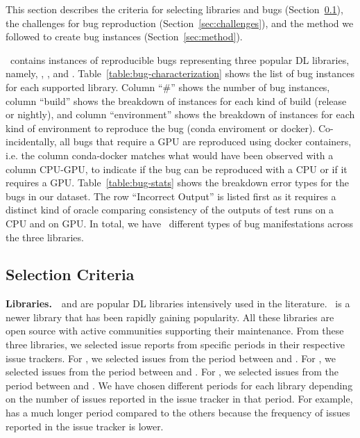 \documentclass[sigconf,screen]{acmart}
\begin{document}
This section describes the criteria for selecting libraries and bugs
(Section~\ref{sec:selection-criterion}), the challenges for bug
reproduction (Section~\ref{sec:challenges}), and the method we
followed to create bug instances (Section~\ref{sec:method}).

\tname\ contains \numbugs{} instances of reproducible bugs
representing three popular DL libraries, namely, \jax, \tf, and
\torch. Table~\ref{table:bug-characterization} shows the list of bug
instances for each supported library. Column ``\#'' shows the number
of bug instances, column ``build'' shows the breakdown of instances
for each kind of build (release or nightly), and column
``environment'' shows the breakdown of instances for each kind of
environment to reproduce the bug (conda enviroment or docker). Co-incidentally,
all bugs that require a GPU are reproduced using docker
containers, i.e. the column conda-docker matches what would have been
observed with a column CPU-GPU, to indicate if the bug can be
reproduced with a CPU or if it requires a
GPU. Table~\ref{table:bug-stats} shows the breakdown error types for
the bugs in our dataset. The row ``Incorrect Output'' is listed first
as it requires a distinct kind of oracle comparing consistency of the
outputs of test runs on a CPU and on GPU. In total, we have
\numbugtypes\ different types of bug manifestations across the three
libraries.

\subsection{Selection Criteria}
\label{sec:selection-criterion}


\textbf{Libraries.}~\torch~and \tf are popular DL libraries
intensively used in the literature. \jax\ is a newer library that has
been rapidly gaining popularity. All these libraries are open source
with active communities supporting their maintenance. From these three
libraries, we selected issue reports from specific periods in their
respective issue trackers. For \torch, we selected issues from the
period between \torchfrom and \torchto. For \tf, we selected issues
from the period between \tffrom and \tfto. For \jax, we selected
issues from the period between \jaxfrom and \jaxto. We have chosen
different periods for each library depending on the number of issues
reported in the issue tracker in that period. For example, \tf has a
much longer period compared to the others because the frequency of
issues reported in the issue tracker is lower.
\end{document}
